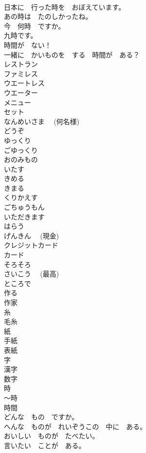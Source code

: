 \documentclass[8pt]{extreport}
\begin{document}
\begin{CJK}{UTF8}{min}
\\	日本に　行った時を　おぼえています。	
\\	あの時は　たのしかったね。	
\\	今　何時　ですか。	
\\	九時です。	
\\	時間が　ない！	
\\	一緒に　かいものを　する　時間が　ある？	
\\	レストラン	
\\	ファミレス	
\\	ウエートレス	
\\	ウエーター	
\\	メニュー	
\\	セット	
\\	なんめいさま　 (何名様)	
\\	どうぞ	
\\	ゆっくり	
\\	ごゆっくり	
\\	おのみもの	
\\	いたす	
\\	きめる	
\\	きまる	
\\	くりかえす	
\\	ごちゅうもん	
\\	いただきます	
\\	はらう	
\\	げんきん　 (現金)	
\\	クレジットカード	
\\	カード	
\\	そろそろ	
\\	さいこう　 (最高)	
\\	ところで	
\\	作る	
\\	作家	
\\	糸	
\\	毛糸	
\\	紙	
\\	手紙	
\\	表紙	
\\	字	
\\	漢字	
\\	数字	
\\	時	
\\	～時	
\\	時間	
\\	どんな　もの　ですか。	
\\	へんな　ものが　れいぞうこの　中に　ある。	
\\	おいしい　ものが　たべたい。	
\\	言いたい　ことが　ある。	

\end{CJK}
\end{document}
